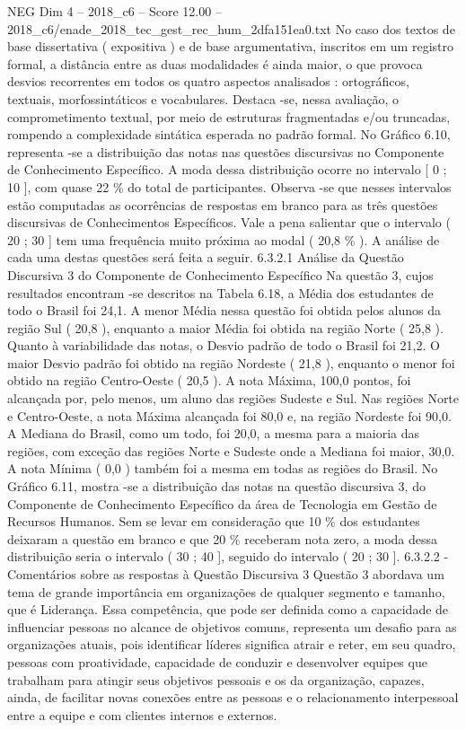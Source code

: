 \begin{textsample}{NEG Dim 4 – 2018\_c6 – Score 12.00 – 2018\_c6/enade\_2018\_tec\_gest\_rec\_hum\_2dfa151ea0.txt}
No caso dos textos de base dissertativa ( expositiva ) e de base argumentativa, inscritos em um registro formal, a distância entre as duas modalidades é ainda maior, o que provoca desvios recorrentes em todos os quatro aspectos analisados : ortográficos, textuais, morfossintáticos e vocabulares.
Destaca -se, nessa avaliação, o comprometimento textual, por meio de estruturas fragmentadas e/ou truncadas, rompendo a complexidade sintática esperada no padrão formal.
No Gráfico 6.10, representa -se a distribuição das notas nas questões discursivas no Componente de Conhecimento Específico.
A moda dessa distribuição ocorre no intervalo [ 0 ; 10 ], com quase 22 \% do total de participantes.
Observa -se que nesses intervalos estão computadas as ocorrências de respostas em branco para as três questões discursivas de Conhecimentos Específicos.
Vale a pena salientar que o intervalo ( 20 ; 30 ] tem uma frequência muito próxima ao modal ( 20,8 \% ).
A análise de cada uma destas questões será feita a seguir. 6.3.2.1 Análise da Questão Discursiva 3 do Componente de Conhecimento Específico Na questão 3, cujos resultados encontram -se descritos na Tabela 6.18, a Média dos estudantes de todo o Brasil foi 24,1.
A menor Média nessa questão foi obtida pelos alunos da região Sul ( 20,8 ), enquanto a maior Média foi obtida na região Norte ( 25,8 ).
Quanto à variabilidade das notas, o Desvio padrão de todo o Brasil foi 21,2.
O maior Desvio padrão foi obtido na região Nordeste ( 21,8 ), enquanto o menor foi obtido na região Centro-Oeste ( 20,5 ).
A nota Máxima, 100,0 pontos, foi alcançada por, pelo menos, um aluno das regiões Sudeste e Sul.
Nas regiões Norte e Centro-Oeste, a nota Máxima alcançada foi 80,0 e, na região Nordeste foi 90,0.
A Mediana do Brasil, como um todo, foi 20,0, a mesma para a maioria das regiões, com exceção das regiões Norte e Sudeste onde a Mediana foi maior, 30,0.
A nota Mínima ( 0,0 ) também foi a mesma em todas as regiões do Brasil.
No Gráfico 6.11, mostra -se a distribuição das notas na questão discursiva 3, do Componente de Conhecimento Específico da área de Tecnologia em Gestão de Recursos Humanos.
Sem se levar em consideração que 10 \% dos estudantes deixaram a questão em branco e que 20 \% receberam nota zero, a moda dessa distribuição seria o intervalo ( 30 ; 40 ], seguido do intervalo ( 20 ; 30 ]. 6.3.2.2 - Comentários sobre as respostas à Questão Discursiva 3 Questão 3 abordava um tema de grande importância em organizações de qualquer segmento e tamanho, que é Liderança.
Essa competência, que pode ser definida como a capacidade de influenciar pessoas no alcance de objetivos comuns, representa um desafio para as organizações atuais, pois identificar líderes significa atrair e reter, em seu quadro, pessoas com proatividade, capacidade de conduzir e desenvolver equipes que trabalham para atingir seus objetivos pessoais e os da organização, capazes, ainda, de facilitar novas conexões entre as pessoas e o relacionamento interpessoal entre a equipe e com clientes internos e externos.

\end{textsample}
